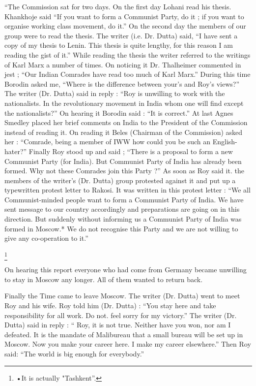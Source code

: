 “The Commission sat for two days. On the first day Lohani read his thesis. Khankhoje said “If you want to form a Communist Party, do it ; if you want to organise working class movement, do it.” On the second day the members of our group were to read the thesis. The writer (i.e. Dr. Dutta) said, “I have sent a copy of my thesis to Lenin. This thesis is quite lengthy, for this reason I am reading the gist of it.” While 
reading the thesis the writer referred to the writings of Karl Marx a number of times. On noticing it Dr. Thalheimer commented in jest ; “Our Indian Comrades have read too much of Karl Marx.” During this time Borodin asked me, “Where is the difference between your’s and Roy’s views?” The writer (Dr. Dutta) said in reply : “Roy is unwilling to work with the nationalists. In the revolutionary movement in India whom one will find except the nationalists?” On hearing it Borodin said : “It is correct.” At last Agnes Smedley placed her brief comments on India to the President of the Commission instead of reading it. On reading it Beles (Chairman of the Commission) asked her : “Comrade, being a member of IWW how could you be such an English-hater?” Finally Roy stood up and said ; “There is a proposal to form a new Communist Party (for India). But Communist Party of India has already been formed. Why not these Comrades join this Party ?” As soon as Roy said it. the members of the writer’s (Dr. Dutta) group protested against it and put up a typewritten protest letter to Rakosi. It was written in this protest letter : “We all Communist-minded people want to form a Communist Party of India. We have sent message to our country accordingly and preparations are going on in this direction. But suddenly without informing us a Communist Party of India was formed in Moscow.* We do not recognise this Party and we are not willing to give any co-operation to it.” 


\footnote{•It is actually "Tashkent”.}

On hearing this report everyone who had come from Germany became unwilling to stay in Moscow any longer. All of them wanted to return back. 

Finally the Time came to leave Moscow. The writer (Dr. Dutta) went to meet Roy and his wife. Roy told him (Dr. Dutta) : “You stay here and take responsibility for all work. Do not. feel sorry for my victory.” The writer (Dr. Dutta) said in reply : “ Roy, it is not true. Neither have you won, nor am I defeated. It is the mandate of Malibureau that a small bureau will be set up in Moscow. Now you make your career here. I make my career elsewhere.” Then Roy said: “The world is big enough for everybody.” 
